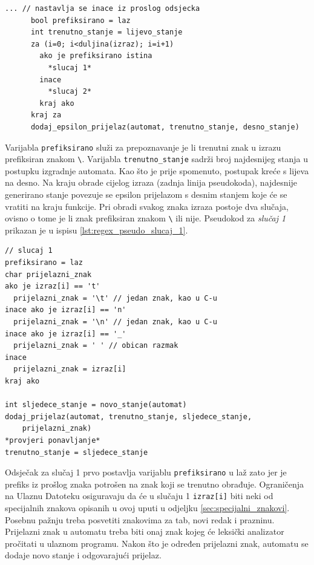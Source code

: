 \documentclass[times, 12pt, utf8]{book}
\begin{document}
\begin{lstlisting}[caption={Obrada nadovezivanja u funkciji \texttt{pretvori}.},label=lst:regex_pseudo_pretvori_3]
      ... // nastavlja se inace iz proslog odsjecka
      bool prefiksirano = laz
      int trenutno_stanje = lijevo_stanje
      za (i=0; i<duljina(izraz); i=i+1)
        ako je prefiksirano istina
          *slucaj 1*
        inace
          *slucaj 2*
        kraj ako
      kraj za
      dodaj_epsilon_prijelaz(automat, trenutno_stanje, desno_stanje)
\end{lstlisting}

Varijabla \verb|prefiksirano| služi za prepoznavanje je li trenutni znak u izrazu prefiksiran znakom \verb|\|.
Varijabla \verb|trenutno_stanje| sadrži broj najdesnijeg stanja u postupku izgradnje automata.
Kao što je prije spomenuto, postupak kreće s lijeva na desno.
Na kraju obrade cijelog izraza (zadnja linija pseudokoda), najdesnije generirano stanje povezuje se epsilon prijelazom s desnim stanjem koje će se vratiti na kraju funkcije.
Pri obradi svakog znaka izraza postoje dva slučaja, ovisno o tome je li znak prefiksiran znakom \verb|\| ili nije.
Pseudokod za \emph{slučaj 1} prikazan je u ispisu \ref{lst:regex_pseudo_slucaj_1}.

\begin{lstlisting}[caption={Slučaj 1 u funkciji \texttt{pretvori}.},label=lst:regex_pseudo_slucaj_1]
// slucaj 1
prefiksirano = laz
char prijelazni_znak
ako je izraz[i] == 't'
  prijelazni_znak = '\t' // jedan znak, kao u C-u
inace ako je izraz[i] == 'n'
  prijelazni_znak = '\n' // jedan znak, kao u C-u
inace ako je izraz[i] == '_'
  prijelazni_znak = ' ' // obican razmak
inace
  prijelazni_znak = izraz[i]
kraj ako

int sljedece_stanje = novo_stanje(automat)
dodaj_prijelaz(automat, trenutno_stanje, sljedece_stanje, 
    prijelazni_znak)
*provjeri ponavljanje*
trenutno_stanje = sljedece_stanje
\end{lstlisting}

Odsječak za slučaj 1 prvo postavlja varijablu \verb|prefiksirano| u laž zato jer je prefiks iz prošlog znaka potrošen na znak koji se trenutno obrađuje.
Ograničenja na Ulaznu Datoteku osiguravaju da će u slučaju 1 \verb|izraz[i]| biti neki od specijalnih znakova opisanih u ovoj uputi u odjeljku \ref{sec:specijalni_znakovi}.
Posebnu pažnju treba posvetiti znakovima za tab, novi redak i prazninu.
Prijelazni znak u automatu treba biti onaj znak kojeg će leksički analizator pročitati u ulaznom programu.
Nakon što je određen prijelazni znak, automatu se dodaje novo stanje i odgovarajući prijelaz. 
\end{document}
